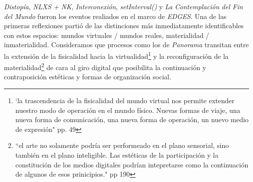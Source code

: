 

\iffalse
\begin{itemize}
\item Distopía
\item domo 
\item Underborders
\item Milena y Concepción
\item setInterval()
\item Contemplación del fin del Mundo
\item sistemas mixtos
\item espacio y performance fusionados en Contemplación
\end{itemize}
\fi


\textit{Distopía}, \textit{NLXS + NK}, \textit{Interconexión}, \textit{setInterval()} y \textit{La Contemplación del Fin del Mundo} fueron los eventos realiados en el marco de \textit{EDGES}. Una de las primeras reflexiones partió de las distinciones más inmediatamente identificables con estos espacios: mundos virtuales / mundos reales, materialidad / inmaterialidad. Consideramos que procesos como los de \textit{Panorama} transitan entre la extensión de la fisicalidad hacia la virtualidad\footnote{`la trascendencia de la fisicalidad del mundo virtual nos permite extender nuestro modo de operación en el mundo físico. Nuevas formas de viaje, una nueva forma de comunicación, una nueva forma de operación, un nuevo medio de expresión" pp. 49} \citep{cyberspace} y la reconfiguración de la materialidad\footnote{``el arte no solamente podría ser performeado en el plano sensorial, sino también en el plano inteligible. Las estéticas de la participación y la constitución de los medios digitales podrían intepretarse como la continuación de algunos de esos prinicipios." pp 190} \citep{andreasosa} de cara al giro digital que posibilita la continuación y contraposición estéticas y formas de organización social. 

\color{black}



